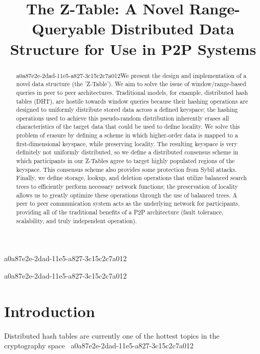\documentclass[12pt]{article}
\title{The Z-Table: A Novel Range-Queryable Distributed Data Structure for Use in P2P Systems}
\begin{document}
a0a87e2e-2dad-11e5-a827-3c15c2c7a012\maketitle
a0a87e2e-2dad-11e5-a827-3c15c2c7a012
\begin{abstract}
a0a87e2e-2dad-11e5-a827-3c15c2c7a012We present the design and implementation of a novel data structure (the 'Z-Table'). We aim to solve the issue of window/range-based queries in peer to peer architectures. Traditional models, for example,  distributed hash tables (DHT), are hostile towards window queries because their hashing operations are designed to uniformly distribute stored data across a defined keyspace; the hashing operations used to achieve this pseudo-random distribution inherently erases all characteristics of the target data that could be used to define locality. We solve this problem of erasure by defining a scheme in which higher-order data is mapped to a first-dimensional keyspace, while preserving locality. The resulting keyspace is very definitely not uniformly distributed, so we define a distributed consensus scheme in which participants in our Z-Tables agree to target highly populated regions of the keyspace. This consensus scheme also provides some protection from Sybil attacks. Finally, we define storage, lookup, and deletion operations that utilize balanced search trees to efficiently perform necessary network functions; the preservation of locality allows us to greatly optimize these operations through the use of balanced trees. A peer to peer communication system acts as the underlying network for participants, providing all of the traditional benefits of a P2P architecture (fault tolerance, scalability, and truly independent operation).
\end{abstract}


\newpage
\section{Introduction}
Distributed hash tables are currently one of the hottest topics in the cryptography space~\cite{Stoica:2001dj,Rowstron:2001ea,Ratnasamy:2001wn}
a0a87e2e-2dad-11e5-a827-3c15c2c7a012
\printbibliography
\end{document}
